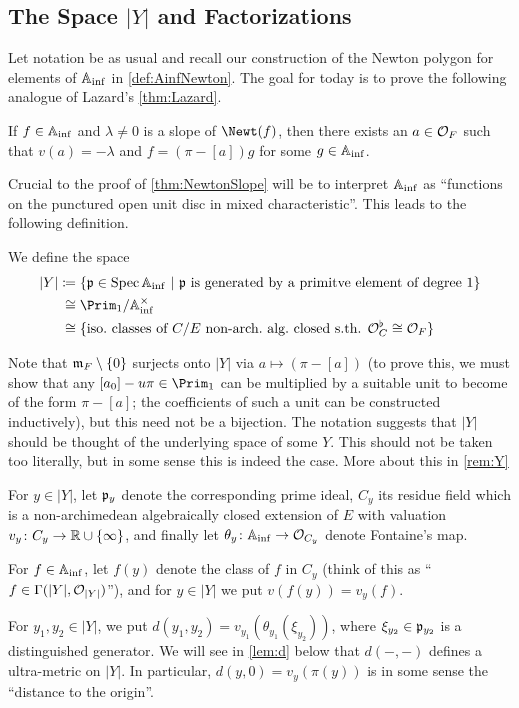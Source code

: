 \subsection{The Space \texorpdfstring{$|Y|$}{|Y|} and Factorizations}
Let notation be as usual and recall our construction of the Newton polygon for elements of $\mathbb{A}_{\mathrm{inf}}$ in \cref{def:AinfNewton}. The goal for today is to prove the following analogue of Lazard's \cref{thm:Lazard}.
\begin{thm}\label{thm:NewtonSlope}
	If $f\in\mathbb{A}_{\mathrm{inf}}$ and $\lambda\neq 0$ is a slope of $\Newt(f)$, then there exists an $a\in\mathcal{O}_F$ such that $v(a)=-\lambda$ and $f=(\pi-[a])g$ for some $g\in\mathbb{A}_{\mathrm{inf}}$.
\end{thm}
Crucial to the proof of \cref{thm:NewtonSlope} will be to interpret $\mathbb{A}_{\mathrm{inf}}$ as \enquote{functions on the punctured open unit disc in mixed characteristic}. This leads to the following definition.
\begin{defi}
	We define the space
	\begin{align*}
		|Y|&\coloneqq\left\{\pp\in\Spec\IA_\inf\st\pp\text{ is generated by a primitve element of degree $1$}\right\}\\
		&\mathrel{{\phantom{\coloneqq}}\mathllap{\cong}} \Prim_1/\IA_\inf^\times\\
		&\mathrel{{\phantom{\coloneqq}}\mathllap{\cong}}\{\text{iso.\ classes of }C/E\text{ non-arch.\ alg.\ closed s.th. }\Oo_C^\flat\cong \Oo_F\}
	\end{align*}
\end{defi}
Note that $\mathfrak{m}_F\setminus\{0\}$ surjects onto $|Y|$ via $a\mapsto(\pi-[a])$ (to prove this, we must show that any $[a_0]-u\pi\in\Prim_1$ can be multiplied by a suitable unit to become of the form $\pi-[a]$; the coefficients of such a unit can be constructed inductively), but this need not be a bijection. The notation suggests that $|Y|$ should be thought of the underlying space of some $Y$. This should not be taken too literally, but in some sense this is indeed the case. More about this in \cref{rem:Y}
\begin{nota}
	\begin{numerate}
		\item For $y\in|Y|$, let $\mathfrak{p}_y$ denote the corresponding prime ideal, $C_y$ its residue field which is a non-archimedean algebraically closed extension of $E$ with valuation $v_y\colon C_y\morphism \IR\cup\{\infty\}$, and finally let $\theta_y\colon \IA_\inf\morphism\Oo_{C_y}$  denote Fontaine's map.
		\item For $f\in\mathbb{A}_{\mathrm{inf}}$, let $f(y)$ denote the class of $f$ in $C_y$ (think of this as \enquote{$f\in\operatorname{\Gamma}(|Y|,\mathcal{O}_{|Y|})$}), and for $y\in |Y|$ we put $v(f(y))=v_y(f)$.
		\item For $y_1,y_2\in|Y|$, we put $d(y_1,y_2)=v_{y_1}(\theta_{y_1}(\xi_{y_2}))$, where $\xi_{y_2}\in\mathfrak{p}_{y_2}$ is a distinguished generator. We will see in \cref{lem:d} below that $d(-,-)$ defines a ultra-metric on $|Y|$. In particular, $d(y,0)=v_y(\pi(y))$ is in some sense the \enquote{distance to the origin}.
	\end{numerate}
\end{nota}
